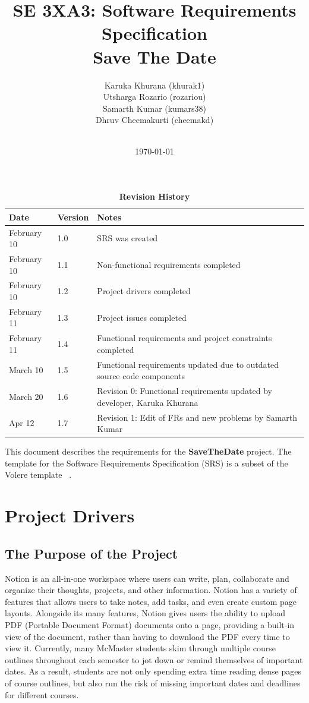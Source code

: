 \documentclass[12pt, titlepage]{article}
\title{SE 3XA3: Software Requirements Specification\\Save The Date}
\author{
        Karuka Khurana (khurak1)\\
        Utsharga Rozario (rozariou)\\
        Samarth Kumar (kumars38)\\
        Dhruv Cheemakurti (cheemakd)\\
        \\
}
\date{\today}
\begin{document}
\maketitle

\tableofcontents
\listoftables
\listoffigures

\newpage

\begin{table}[p]
\caption{\bf Revision History}
\begin{tabularx}{\textwidth}{p{3cm}p{2cm}X}
\toprule {\bf Date} & {\bf Version} & {\bf Notes}\\
\midrule
February 10 & 1.0 & SRS was created\\
February 10 & 1.1 & Non-functional requirements completed\\
February 10 & 1.2 & Project drivers completed\\
February 11 & 1.3 & Project issues completed\\
February 11 & 1.4 & Functional requirements and project constraints completed\\
March 10 & 1.5 & Functional requirements updated due to outdated source code components\\
March 20 & 1.6 & Revision 0: Functional requirements updated by developer, Karuka Khurana\\
Apr 12 & 1.7 & Revision 1: Edit of FRs and new problems by Samarth Kumar\\
\bottomrule
\end{tabularx}
\end{table}

\clearpage


\newpage

This document describes the requirements for the \textbf{SaveTheDate} project. 
The template for the Software Requirements Specification (SRS) is a subset of the Volere
template ~\citep{RobertsonAndRobertson2012}.

\section{Project Drivers}

\subsection{The Purpose of the Project}
Notion is an all-in-one workspace where users can write, plan, collaborate and organize their thoughts, projects, and other information. Notion has a variety of features that allows users to take notes, add tasks, and even create custom page layouts. Alongside its many features, Notion gives users the ability to upload PDF (Portable Document Format) documents onto a page, providing a built-in view of the document, rather than having to download the PDF every time to view it. Currently, many McMaster students skim through multiple course outlines throughout each semester to jot down or remind themselves of important dates. As a result, students are not only spending extra time reading dense pages of course outlines, but also run the risk of missing important dates and deadlines for different courses.  
\end{document}
